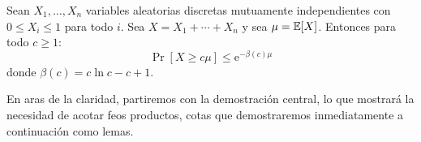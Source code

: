   \begin{theorem}
    \label{theo:Chernoff-upper-tail}
    Sean \(X_1, \dotsc, X_n\) variables aleatorias discretas
    mutuamente independientes
    con \(0 \le X_i \le 1\) para todo \(i\).
    Sea \(X = X_1 + \dotsb + X_n\)
    y sea \(\mu = \operatorname{\mathbb{E}}[X]\).
    Entonces para todo \(c \ge 1\):
    \begin{equation}
      \label{eq:Chernoff-upper-tail}
      \Pr[X \ge c \mu]
        \le \mathrm{e}^{- \beta(c) \mu}
    \end{equation}
    donde \(\beta(c) = c \ln c - c + 1\).
  \end{theorem}
  En aras de la claridad,
  partiremos con la demostración central,
  lo que mostrará la necesidad
  de acotar feos productos,
  cotas que demostraremos inmediatamente a continuación como lemas.


